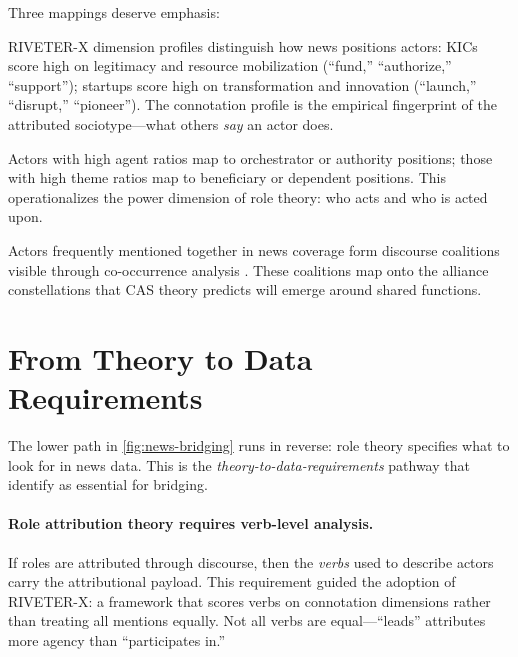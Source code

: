 \documentclass[../main.tex]{subfiles}
\begin{document}
Three mappings deserve emphasis:

\begin{description}[leftmargin=0.5cm, itemsep=0.3em]
\item[Verb connotations $\rightarrow$ Attributed sociotype.]
RIVETER-X dimension profiles distinguish how news positions actors:
KICs score high on legitimacy and resource mobilization
(``fund,'' ``authorize,'' ``support'');
startups score high on transformation and innovation
(``launch,'' ``disrupt,'' ``pioneer'').
The connotation profile is the empirical fingerprint
of the attributed sociotype---what others \emph{say} an actor does.

\item[Agent/theme ratio $\rightarrow$ Structural position.]
Actors with high agent ratios map to orchestrator or
authority positions; those with high theme ratios map to
beneficiary or dependent positions.
This operationalizes the power dimension of role theory:
who acts and who is acted upon.

\item[Co-occurrence networks $\rightarrow$ Discourse coalitions.]
Actors frequently mentioned together in news coverage form
discourse coalitions visible through co-occurrence analysis
\parencite{leifeld2013dna}.
These coalitions map onto the alliance constellations
that CAS theory predicts will emerge around shared functions.
\end{description}


\section{From Theory to Data Requirements}
\label{sec:news-theory-data}

The lower path in \cref{fig:news-bridging} runs in reverse:
role theory specifies what to look for in news data.
This is the \emph{theory-to-data-requirements} pathway that
\textcite{maass2018data} identify as essential for bridging.

\paragraph{Role attribution theory requires verb-level analysis.}
If roles are attributed through discourse, then the \emph{verbs}
used to describe actors carry the attributional payload.
This requirement guided the adoption of RIVETER-X:
a framework that scores verbs on connotation dimensions
rather than treating all mentions equally.
Not all verbs are equal---``leads'' attributes more agency
than ``participates in.''
\end{document}
